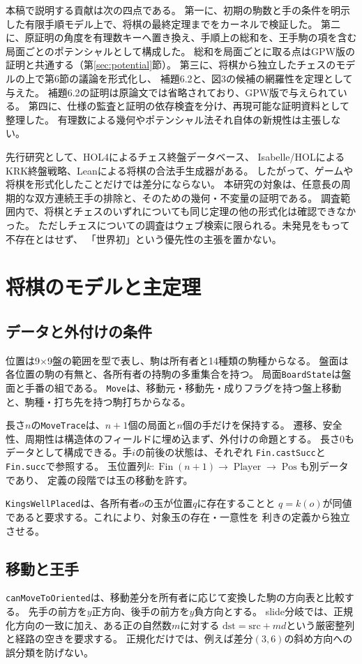 \documentclass[a4paper,11pt]{article}
\newcommand{\code}[1]{{\small\nolinkurl{#1}}}
\theoremstyle{definition}
\begin{document}
本稿で説明する貢献は次の四点である。
第一に、初期の駒数と手の条件を明示した有限手順モデル上で、将棋の最終定理までをカーネルで検証した。
第二に、原証明の角度を有理数キーへ置き換え、手順上の総和を、王手駒の項を含む局面ごとのポテンシャルとして構成した。
総和を局面ごとに取る点はGPW版の証明と共通する（第\ref{sec:potential}節）。
第三に、将棋から独立したチェスのモデルの上で第6節の議論を形式化し、
補題6.2と、図3の候補の網羅性を定理として与えた。
補題6.2の証明は原論文では省略されており、GPW版で与えられている。
第四に、仕様の監査と証明の依存検査を分け、再現可能な証明資料として整理した。
有理数による幾何やポテンシャル法それ自体の新規性は主張しない。

先行研究として、HOL4によるチェス終盤データベース\cite{hurd}、
Isabelle/HOLによるKRK終盤戦略\cite{krk}、Leanによる将棋の合法手生成器\cite{yam}がある。
したがって、ゲームや将棋を形式化したことだけでは差分にならない。
本研究の対象は、任意長の周期的な双方連続王手の排除と、そのための幾何・不変量の証明である。
調査範囲内で、将棋とチェスのいずれについても同じ定理の他の形式化は確認できなかった。
ただしチェスについての調査はウェブ検索に限られる。未発見をもって不存在とはせず、
「世界初」という優先性の主張を置かない。

\section{将棋のモデルと主定理}
\subsection{データと外付けの条件}
位置は9\(\times\)9盤の範囲を型で表し、駒は所有者と14種類の駒種からなる。
盤面は各位置の駒の有無と、各所有者の持駒の多重集合を持つ。
局面\code{BoardState}は盤面と手番の組である。
\code{Move}は、移動元・移動先・成りフラグを持つ盤上移動と、駒種・打ち先を持つ駒打ちからなる。

長さ\(n\)の\code{MoveTrace}は、\(n+1\)個の局面と\(n\)個の手だけを保持する。
遷移、安全性、周期性は構造体のフィールドに埋め込まず、外付けの命題とする。
長さ0もデータとして構成できる。手\(i\)の前後の状態は、それぞれ
\code{Fin.castSucc}と\code{Fin.succ}で参照する。
玉位置列\(k:\operatorname{Fin}(n+1)\to\operatorname{Player}\to\operatorname{Pos}\)も別データであり、
定義の段階では玉の移動を許す。

\code{KingsWellPlaced}は、各所有者\(o\)の玉が位置\(q\)に存在することと
\(q=k(o)\)が同値であると要求する。これにより、対象玉の存在・一意性を
利きの定義から独立させる。

\subsection{移動と王手}
\code{canMoveToOriented}は、移動差分を所有者に応じて変換した駒の方向表と比較する。
先手の前方を\(y\)正方向、後手の前方を\(y\)負方向とする。
slide分岐では、正規化方向の一致に加え、ある正の自然数\(m\)に対する
\(\mathrm{dst}=\mathrm{src}+m d\)という厳密整列と経路の空きを要求する。
正規化だけでは、例えば差分\((3,6)\)の斜め方向への誤分類を防げない。
\end{document}

